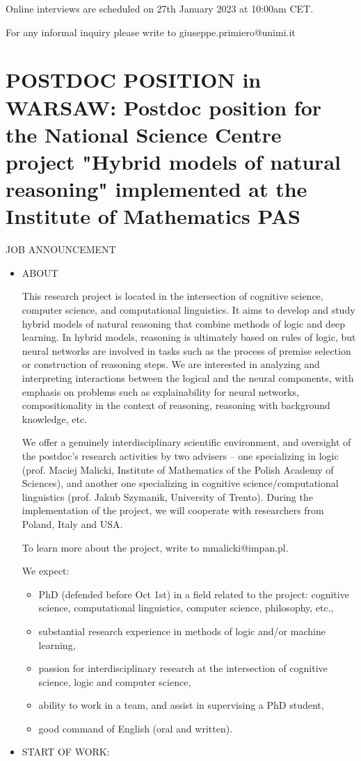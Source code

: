 \documentclass[prodmode,acmtecs]{acmsmall} %
\begin{document}
\begin{itemize}
  Online interviews are scheduled on 27th January 2023 at 10:00am CET. 
 
  For any informal inquiry please write to giuseppe.primiero@unimi.it 
 
\end{itemize}\section{POSTDOC POSITION in WARSAW: Postdoc position for the National Science Centre project "Hybrid models of natural reasoning" implemented at the Institute of Mathematics PAS}\label{POSTDOCPOSITIONinWARSAW}JOB ANNOUNCEMENT 

\begin{itemize}\item  ABOUT 
 
  This research project is located in the intersection of cognitive science, computer science, and computational linguistics. It aims to develop and study hybrid models of natural reasoning that combine methods of logic and deep learning. In hybrid models, reasoning is ultimately based on rules of logic, but neural networks are involved in tasks such as the process of premise selection or construction of reasoning steps. We are interested in analyzing and interpreting interactions between the logical and the neural components, with emphasis on problems such as explainability for neural networks, compositionality in the context of reasoning, reasoning with background knowledge, etc. 
 
  We offer a genuinely interdisciplinary scientific environment, and oversight of the postdoc’s research activities by two advisers – one specializing in logic (prof. Maciej Malicki, Institute of Mathematics of the Polish Academy of Sciences), and another one specializing in cognitive science/computational linguistics (prof. Jakub Szymanik, University of Trento). During the implementation of the project, we will cooperate with researchers from Poland, Italy and USA.   
 
  To learn more about the project, write to mmalicki@impan.pl.  
 
  We expect: 
 
\begin{itemize}\item  PhD (defended before Oct 1st) in a field related to the project: cognitive science, computational linguistics, computer science, philosophy, etc.,
\item  substantial research experience in methods of logic and/or machine learning,
\item  passion for interdisciplinary research at the intersection of cognitive science, logic and computer science,
\item  ability to work in a team, and assist in supervising a PhD student,
\item  good command of English (oral and written).
\end{itemize} 
\item  START OF WORK:  
 

\end{itemize}
\end{document}
